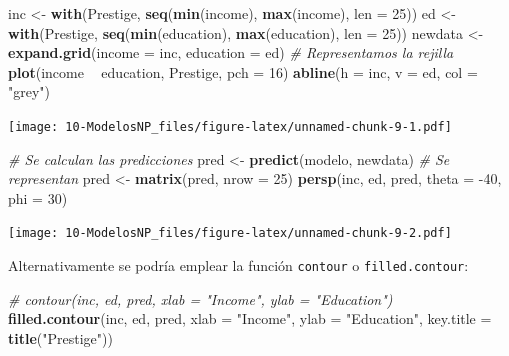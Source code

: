 \documentclass[]{book}
\newenvironment{Shaded}{\begin{snugshade}}{\end{snugshade}}
\newcommand{\CommentTok}[1]{\textcolor[rgb]{0.56,0.35,0.01}{\textit{#1}}}
\newcommand{\DataTypeTok}[1]{\textcolor[rgb]{0.13,0.29,0.53}{#1}}
\newcommand{\DecValTok}[1]{\textcolor[rgb]{0.00,0.00,0.81}{#1}}
\newcommand{\KeywordTok}[1]{\textcolor[rgb]{0.13,0.29,0.53}{\textbf{#1}}}
\newcommand{\NormalTok}[1]{#1}
\newcommand{\OperatorTok}[1]{\textcolor[rgb]{0.81,0.36,0.00}{\textbf{#1}}}
\newcommand{\StringTok}[1]{\textcolor[rgb]{0.31,0.60,0.02}{#1}}
\begin{document}
\begin{Shaded}
\begin{Highlighting}[]
\NormalTok{inc <-}\StringTok{ }\KeywordTok{with}\NormalTok{(Prestige, }\KeywordTok{seq}\NormalTok{(}\KeywordTok{min}\NormalTok{(income), }\KeywordTok{max}\NormalTok{(income), }\DataTypeTok{len =} \DecValTok{25}\NormalTok{))}
\NormalTok{ed <-}\StringTok{ }\KeywordTok{with}\NormalTok{(Prestige, }\KeywordTok{seq}\NormalTok{(}\KeywordTok{min}\NormalTok{(education), }\KeywordTok{max}\NormalTok{(education), }\DataTypeTok{len =} \DecValTok{25}\NormalTok{))}
\NormalTok{newdata <-}\StringTok{ }\KeywordTok{expand.grid}\NormalTok{(}\DataTypeTok{income =}\NormalTok{ inc, }\DataTypeTok{education =}\NormalTok{ ed)}
\CommentTok{# Representamos la rejilla}
\KeywordTok{plot}\NormalTok{(income }\OperatorTok{~}\StringTok{ }\NormalTok{education, Prestige, }\DataTypeTok{pch =} \DecValTok{16}\NormalTok{)}
\KeywordTok{abline}\NormalTok{(}\DataTypeTok{h =}\NormalTok{ inc, }\DataTypeTok{v =}\NormalTok{ ed, }\DataTypeTok{col =} \StringTok{"grey"}\NormalTok{)}
\end{Highlighting}
\end{Shaded}

\texttt{[image: 10-ModelosNP\_files/figure-latex/unnamed-chunk-9-1.pdf]}

\begin{Shaded}
\begin{Highlighting}[]
\CommentTok{# Se calculan las predicciones}
\NormalTok{pred <-}\StringTok{ }\KeywordTok{predict}\NormalTok{(modelo, newdata)}
\CommentTok{# Se representan}
\NormalTok{pred <-}\StringTok{ }\KeywordTok{matrix}\NormalTok{(pred, }\DataTypeTok{nrow =} \DecValTok{25}\NormalTok{)}
\KeywordTok{persp}\NormalTok{(inc, ed, pred, }\DataTypeTok{theta =} \DecValTok{-40}\NormalTok{, }\DataTypeTok{phi =} \DecValTok{30}\NormalTok{)}
\end{Highlighting}
\end{Shaded}

\texttt{[image: 10-ModelosNP\_files/figure-latex/unnamed-chunk-9-2.pdf]}

Alternativamente se podría emplear la función \texttt{contour} o \texttt{filled.contour}:

\begin{Shaded}
\begin{Highlighting}[]
\CommentTok{# contour(inc, ed, pred, xlab = "Income", ylab = "Education")}
\KeywordTok{filled.contour}\NormalTok{(inc, ed, pred, }\DataTypeTok{xlab =} \StringTok{"Income"}\NormalTok{, }\DataTypeTok{ylab =} \StringTok{"Education"}\NormalTok{, }\DataTypeTok{key.title =} \KeywordTok{title}\NormalTok{(}\StringTok{"Prestige"}\NormalTok{))}
\end{Highlighting}
\end{Shaded}
\end{document}
